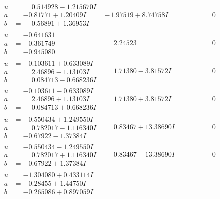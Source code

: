 \documentclass[1p]{elsarticle_modified}
\theoremstyle{definition}
\begin{document}
$$\begin{array}{c|c|c}
\begin{aligned}
u &= \phantom{-}0.514928 - 1.215670 I \\
a &= -0.81771 + 1.20409 I \\
b &= \phantom{-}0.56891 + 1.36953 I\end{aligned}
 & -1.97519 + 8.74758 I & \phantom{-0.000000 } 0 \\ \hline\begin{aligned}
u &= -0.641631\phantom{ +0.000000I} \\
a &= -0.361749\phantom{ +0.000000I} \\
b &= -0.945080\phantom{ +0.000000I}\end{aligned}
 & \phantom{-}2.24523\phantom{ +0.000000I} & \phantom{-0.000000 } 0 \\ \hline\begin{aligned}
u &= -0.103611 + 0.633089 I \\
a &= \phantom{-}2.46896 - 1.13103 I \\
b &= \phantom{-}0.084713 - 0.668236 I\end{aligned}
 & \phantom{-}1.71380 - 3.81572 I & \phantom{-0.000000 } 0 \\ \hline\begin{aligned}
u &= -0.103611 - 0.633089 I \\
a &= \phantom{-}2.46896 + 1.13103 I \\
b &= \phantom{-}0.084713 + 0.668236 I\end{aligned}
 & \phantom{-}1.71380 + 3.81572 I & \phantom{-0.000000 } 0 \\ \hline\begin{aligned}
u &= -0.550434 + 1.249550 I \\
a &= \phantom{-}0.782017 - 1.116340 I \\
b &= -0.67922 - 1.37384 I\end{aligned}
 & \phantom{-}0.83467 + 13.38690 I & \phantom{-0.000000 } 0 \\ \hline\begin{aligned}
u &= -0.550434 - 1.249550 I \\
a &= \phantom{-}0.782017 + 1.116340 I \\
b &= -0.67922 + 1.37384 I\end{aligned}
 & \phantom{-}0.83467 - 13.38690 I & \phantom{-0.000000 } 0 \\ \hline\begin{aligned}
u &= -1.304080 + 0.433114 I \\
a &= -0.28455 + 1.44750 I \\
b &= -0.265086 + 0.897059 I\end{aligned}

\end{array}$$
\end{document}
